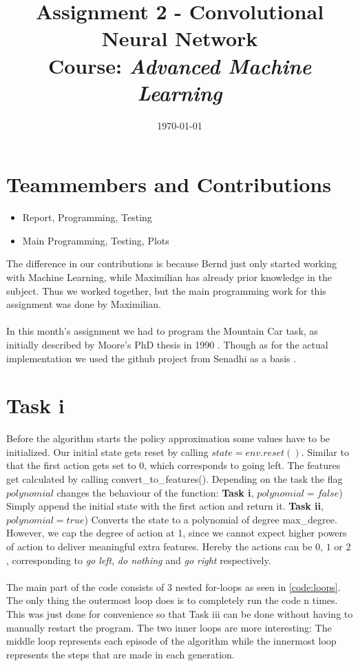 \documentclass{article}
\title{Assignment 2 - Convolutional Neural Network\\
		{\large Course: \textit{Advanced Machine Learning}}}
\date{\today}
\begin{document}
	
	\maketitle
	
	\section{Teammembers and Contributions}
	\label{sec:TeammembersAndContributions}
	
	\begin{itemize}
		\item {} Report, Programming, Testing
		\item {} Main Programming, Testing, Plots
	\end{itemize}
	
	\noindent The difference in our contributions is because Bernd just only started working with Machine Learning, while Maximilian has already prior knowledge in the subject. Thus we worked together, but the main programming work for this assignment was done by Maximilian. \\
	\\
	In this month's assignment we had to program the Mountain Car task, as initially described by Moore's PhD thesis in 1990 \cite{Moore90efficientmemory-based}. Though as for the actual implementation we used the github project from Senadhi as a basis \cite{MountainCar-v02018}. 
	
	
	\section{Task i}
	\label{sec:Taski}
	Before the algorithm starts the policy approximation some values have to be initialized. Our initial state gets reset by calling $state = env.reset()$. Similar to that the first action gets set to $0$, which corresponds to going left. The features get calculated by calling convert\_to\_features(). Depending on the task the flag $polynomial$ changes the behaviour of the function: \textbf{Task i}, $polynomial = false$) Simply append the initial state with the first action and return it. \textbf{Task ii}, $polynomial = true$) Converts the state to a polynomial of degree max\_degree. However, we cap the degree of action at 1, since we cannot expect higher powers of action to deliver meaningful extra features. Hereby the actions can be $0$, $1$ or $2$, corresponding to \textit{go left}, \textit{do nothing} and \textit{go right} respectively.\\
	\\
	The main part of the code consists of 3 nested for-loops as seen in \autoref{code:loops}. The only thing the outermost loop does is to completely run the code n times. This was just done for convenience so that Task iii can be done without having to manually restart the program. The two inner loops are more interesting: The middle loop represents each episode of the algorithm while the innermost loop represents the steps that are made in each generation. 
	
\end{document}
